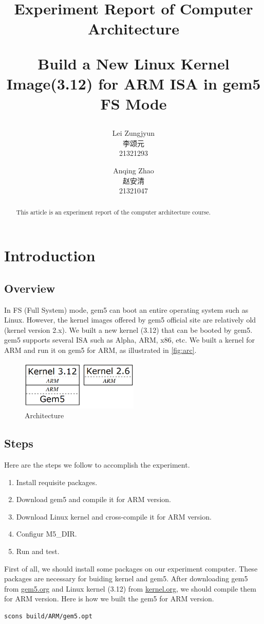 \documentclass[utf8,a4paper]{article}
\title{\textbf{\sffamily Experiment Report of Computer Architecture}\\  \begin{large}\sffamily Build a New Linux Kernel Image(3.12) for ARM ISA in gem5 FS Mode \end{large}
}
\author{Lei Zungjyun\\李颂元\\21321293 \and Anqing Zhao\\赵安清\\21321047}
\begin{document}
\maketitle

\begin{abstract}
This article is an experiment report of the computer architecture course. 
\end{abstract}

\section{Introduction}
	\subsection{Overview}
	In FS (Full System) mode, gem5 can boot an entire operating system such as Linux. However, the kernel images offered by gem5 official site are relatively old (kernel version 2.x). We built a new kernel (3.12) that can be booted by gem5. gem5 supports several ISA such as Alpha, ARM, x86, etc. We built a kernel for ARM and run it on gem5 for ARM, as illustrated in \autoref{fig:arc}.


	\begin{figure}[htbp]
		\centering
		\includegraphics[width=0.5\textwidth]{images/arch2.png}
		\caption{Architecture}\label{fig:arc}	%
	\end{figure}
	\subsection{Steps}\label{text:steps}
		Here are the steps we follow to accomplish the experiment.
		\begin{enumerate}
			\item
			Install requisite packages.
			\item
			Download gem5 and compile it for ARM version.
			\item
			Download Linux kernel and cross-compile it for ARM version.
			\item
			Configur M5\_DIR.
			\item
			Run and test.
		\end{enumerate}
		First of all, we should install some packages on our experiment computer. These packages are necessary for buiding kernel and gem5. After downloading gem5 from \url{gem5.org} and Linux kernel (3.12) from \url{kernel.org}, we should compile them for ARM version. Here is how we built the gem5 for ARM version.
\begin{lstlisting}[language=bash, frame=shadowbox]
scons build/ARM/gem5.opt 
\end{lstlisting}
\end{document}
